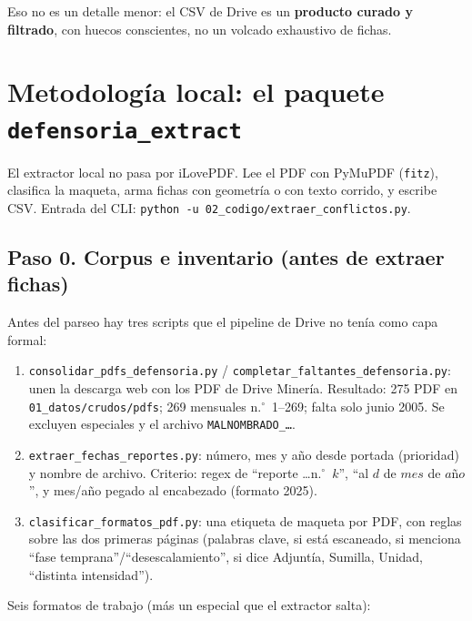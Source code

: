 \documentclass[11pt,a4paper]{article}
\begin{document}
Eso no es un detalle menor: el CSV de Drive es un \textbf{producto curado y filtrado}, con huecos conscientes, no un volcado exhaustivo de fichas.

\section{Metodología local: el paquete \texttt{defensoria\_extract}}

El extractor local no pasa por iLovePDF. Lee el PDF con PyMuPDF (\texttt{fitz}), clasifica la maqueta, arma fichas con geometría o con texto corrido, y escribe CSV. Entrada del CLI: \texttt{python -u 02\_codigo/extraer\_conflictos.py}.

\subsection{Paso 0. Corpus e inventario (antes de extraer fichas)}

Antes del parseo hay tres scripts que el pipeline de Drive no tenía como capa formal:

\begin{enumerate}
  \item \texttt{consolidar\_pdfs\_defensoria.py} / \texttt{completar\_faltantes\_defensoria.py}: unen la descarga web con los PDF de Drive Minería. Resultado: 275 PDF en \texttt{01\_datos/crudos/pdfs}; 269 mensuales n.$^\circ$~1--269; falta solo junio 2005. Se excluyen especiales y el archivo \texttt{MALNOMBRADO\_\ldots}.
  \item \texttt{extraer\_fechas\_reportes.py}: número, mes y año desde portada (prioridad) y nombre de archivo. Criterio: regex de ``reporte \ldots n.$^\circ$~$k$'', ``al $d$ de $mes$ de $año$'', y mes/año pegado al encabezado (formato 2025).
  \item \texttt{clasificar\_formatos\_pdf.py}: una etiqueta de maqueta por PDF, con reglas sobre las dos primeras páginas (palabras clave, si está escaneado, si menciona ``fase temprana''/``desescalamiento'', si dice Adjuntía, Sumilla, Unidad, ``distinta intensidad'').
\end{enumerate}

Seis formatos de trabajo (más un especial que el extractor salta):
\end{document}
